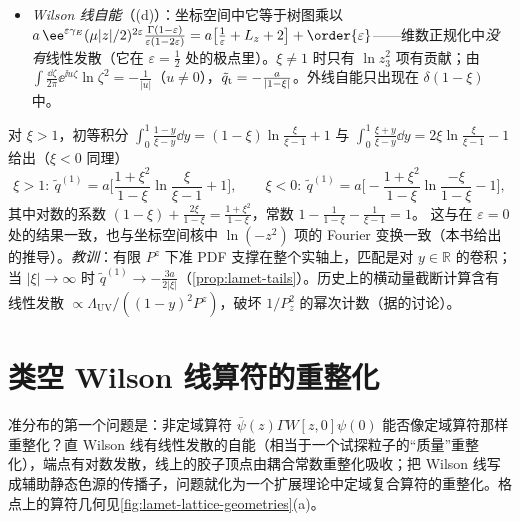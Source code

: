 \begin{example}
\begin{itemize}[leftmargin=1.5em,itemsep=1pt,topsep=2pt]
$\xi\neq1$ 时只有第二项通过 Fourier 投影，给出 $-\delta(k^z-\xi p^z)/[(1-\xi)p^z]$ 型的因子。Dirac 迹 $\frac12\Tr[\sla p\gamma^0\sla k\sla{\hat e}_z]=-2(p^0k^z+p^zk^0)$，Feynman 参数化后（$l^0$ 的奇次项为零）化为 $-2p_z^2(\xi+1-y)$；三维积分 $\int\frac{\dd^3l}{(2\pi)^3}(l^2+\ii0)^{-2}=\frac{\ii}{8\pi|l^z|}$。每个帆图给出 $\frac a2\frac1{1-\xi}\int_0^1\dd y\frac{\xi+1-y}{|\xi-1+y|}$，两图之和为 $\tilde q_{\rm s}=\frac a{1-\xi}\int_0^1\dd y\frac{\xi+y}{|\xi-y|}$。
\item \emph{Wilson 线自能}（(d)）：坐标空间中它等于树图乘以 $a\,\ee^{\varepsilon\gamma_E}(\mu|z|/2)^{2\varepsilon}\frac{\Gamma(1-\varepsilon)}{\varepsilon(1-2\varepsilon)}=a\big[\frac1\varepsilon+L_z+2\big]+\order{\varepsilon}$——维数正规化中\emph{没有}线性发散（它在 $\varepsilon=\frac12$ 处的极点里）。$\xi\neq1$ 时只有 $\ln z_3^2$ 项有贡献；由 $\int\frac{\dd\zeta}{2\pi}\ee^{\ii u\zeta}\ln\zeta^2=-\frac1{|u|}$（$u\neq0$），$\tilde q_{\rm t}=-\frac a{|1-\xi|}$。外线自能只出现在 $\delta(1-\xi)$ 中。
\end{itemize}
对 $\xi>1$，初等积分 $\int_0^1\frac{1-y}{\xi-y}\dd y=(1-\xi)\ln\frac\xi{\xi-1}+1$ 与 $\int_0^1\frac{\xi+y}{\xi-y}\dd y=2\xi\ln\frac\xi{\xi-1}-1$ 给出（$\xi<0$ 同理）
\begin{equation}\label{eq:lamet-unphysical}
\xi>1:\ \tilde q^{(1)}=a\Big[\frac{1+\xi^2}{1-\xi}\ln\frac{\xi}{\xi-1}+1\Big],\qquad
\xi<0:\ \tilde q^{(1)}=a\Big[-\frac{1+\xi^2}{1-\xi}\ln\frac{-\xi}{1-\xi}-1\Big],
\end{equation}
其中对数的系数 $(1-\xi)+\frac{2\xi}{1-\xi}=\frac{1+\xi^2}{1-\xi}$，常数 $1-\frac1{1-\xi}-\frac1{\xi-1}=1$。%
这与\cite[附录~B]{IzubuchiEtAl2018}在 $\varepsilon=0$ 处的结果一致，也与坐标空间核中 $\ln(-z^2)$ 项的 Fourier 变换一致（本书给出的推导）。\emph{教训}：有限 $P^z$ 下准 PDF 支撑在整个实轴上，匹配是对 $y\in\mathbb R$ 的卷积；当 $|\xi|\to\infty$ 时 $\tilde q^{(1)}\to-\frac{3a}{2|\xi|}$（\cref{prop:lamet-tails}）。历史上的横动量截断计算\cite{XiongEtAl2014}含有线性发散 $\propto\Lambda_{\mathrm{UV}}/((1-y)^2P^z)$，破坏 $1/P_z^2$ 的幂次计数（据\cite{JiEtAl2021}的讨论）。
\end{example}

\section{类空 Wilson 线算符的重整化}\label{sec:lamet-renorm}

准分布的第一个问题是：非定域算符 $\bar\psi(z)\Gamma W[z,0]\psi(0)$ 能否像定域算符那样重整化？直 Wilson 线有线性发散的自能（相当于一个试探粒子的“质量”重整化），端点有对数发散，线上的胶子顶点由耦合常数重整化吸收\cite{Polyakov1980,Dotsenko:1979wb,BrandtNeriSato1981,Craigie:1980qs}；把 Wilson 线写成辅助静态色源的传播子，问题就化为一个扩展理论中定域复合算符的重整化\cite{Dorn:1986dt}。格点上的算符几何见\cref{fig:lamet-lattice-geometries}(a)。

